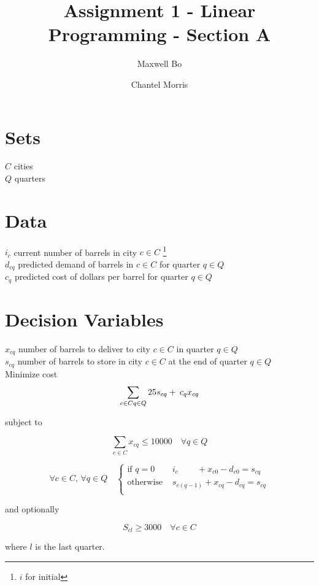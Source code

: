 \documentclass[a4paper]{article}
\title{Assignment 1 - Linear Programming - Section A}
\author{Maxwell Bo  \and Chantel Morris}
\begin{document}
 

\maketitle

\section*{Sets}

$C$ cities\\
$Q$ quarters\\

\section*{Data}

$i_c$ current number of barrels in city $c \in C$ \footnote{$i$ for initial}\\
$d_{cq}$ predicted demand of barrels in $c \in C$ for quarter $q \in Q$\\
$c_q$ predicted cost of dollars per barrel for quarter $q \in Q$\\

\section*{Decision Variables}

$x_{cq}$ number of barrels to deliver to city $c \in C$ in quarter $q \in Q$\\
$s_{cq}$ number of barrels to store in city $c \in C$ at the end of quarter $q \in Q$\\

Minimize cost
\[
\sum_{c \in C\\ q \in Q} 25 s_{cq} +\: c_q x_{cq}
\]

subject to

\[
\sum_{c \in C} x_{cq} \leq 10000 \quad \forall q \in Q
\]

\[
\forall c \in C,\, \forall q \in Q \quad \begin{cases}
    \text{if }  q = 0 & i_{c} \qquad \, +  x_{c0} - d_{c0} = s_{cq}\\
    \text{otherwise } & s_{c(q - 1)} +  x_{cq} - d_{cq} = s_{cq}\\
\end{cases}
\]

and optionally

\[
    S_{cl} \geq 3000 \quad \forall c \in C
\]

where $l$ is the last quarter. 
\end{document}

